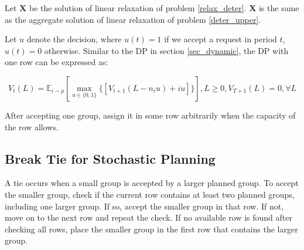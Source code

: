 \begin{lem}
 Let $\mathbf{X}$ be the solution of linear relaxation of problem \eqref{relax_deter}. $\mathbf{X}$ is the same as the aggregate
 solution of linear relaxation of problem \eqref{deter_upper}.
\end{lem}


Let $u$ denote the decision, where $u(t) = 1$ if we accept a request in period $t$, $u(t) =0$ otherwise. Similar to the DP in section \ref{sec_dynamic}, the DP with one row can be expressed as:

$$V_{t}(L) = \mathbb{E}_{i \sim p} [\max_{u \in \{0,1\}} \{ {[V_{t+1}(L-n_i u)+ i u]}\}], L \geq 0, V_{T+1}(L) =0, \forall L$$

After accepting one group, assign it in some row arbitrarily when the capacity of the row allows.




\subsection{Break Tie for Stochastic Planning}
A tie occurs when a small group is accepted by a larger planned group. To accept the smaller group, check if the current row contains at least two planned groups, including one larger group. If so, accept the smaller group in that row. If not, move on to the next row and repeat the check. If no available row is found after checking all rows, place the smaller group in the first row that contains the larger group.

